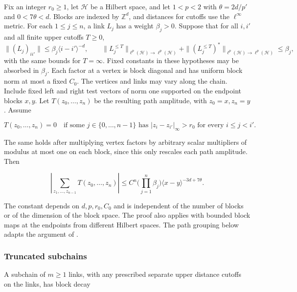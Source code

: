 \documentclass[11pt]{article}
\begin{document}
Fix an integer \(r_0\ge1\), let \(\mathscr H\) be a Hilbert space, and let \(1<p<2\) with \(\theta=2d/p'\) and \(0<7\theta<d\). Blocks are indexed by \(\mathbb Z^d\), and distances for cutoffs use the \(\ell^\infty\) metric. For each \(1\le j\le n\), a link \(L_j\) has a weight \(\beta_j>0\). Suppose that for all \(i,i'\) and all finite upper cutoffs \(T\ge0\), \[
\|(L_j)_{ii'}\|\le\beta_j\langle i-i'\rangle^{-d},\qquad
\|L_j^{\le T}\|_{\ell^p(\mathscr H)\to\ell^p(\mathscr H)}
+\|(L_j^{\le T})^*\|_{\ell^p(\mathscr H)\to\ell^p(\mathscr H)}
\le\beta_j,
\] with the same bounds for \(T=\infty\). Fixed constants in these hypotheses may be absorbed in \(\beta_j\). Each factor at a vertex is block diagonal and has uniform block norm at most a fixed \(C_0\). The vertices and links may vary along the chain. Include fixed left and right test vectors of norm one supported on the endpoint blocks \(x,y\). Let \(T(z_0,\ldots,z_n)\) be the resulting path amplitude, with \(z_0=x,z_n=y\). Assume

\begin{equation}\label{eq:independent-cut}
T(z_0,\ldots,z_n)=0
\quad\text{if some } j\in\{0,\ldots,n-1\}
\text{ has }|z_i-z_{i'}|_\infty>r_0
\text{ for every }i\le j<i'.
\end{equation}

The same holds after multiplying vertex factors by arbitrary scalar multipliers of modulus at most one on each block, since this only rescales each path amplitude. Then

\begin{equation}\label{eq:chain-bound}
\left|\sum_{z_1,\ldots,z_{n-1}}T(z_0,\ldots,z_n)\right|
\le C^n\Big(\prod_{j=1}^n\beta_j\Big)\langle x-y\rangle^{-3d+7\theta}.
\end{equation}

The constant depends on \(d,p,r_0,C_0\) and is independent of the number of blocks or of the dimension of the block space. The proof also applies with bounded block maps at the endpoints from different Hilbert spaces. The path grouping below adapts the argument of \cite[Lemma 4.6, Lemma 5.5 and Section 5.4]{DLP}.

\subsubsection{Truncated subchains}\label{truncated-subchains}

A subchain of \(m\ge1\) links, with any prescribed separate upper distance cutoffs on the links, has block decay
\end{document}
